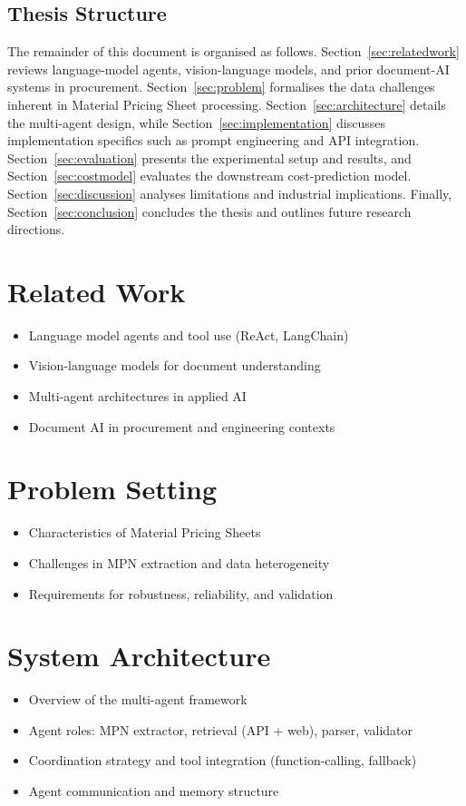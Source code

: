 \documentclass[11pt]{article}
\begin{document}
\subsection{Thesis Structure}
The remainder of this document is organised as follows.  
Section~\ref{sec:relatedwork} reviews language-model agents, vision-language models, and prior document-AI systems in procurement.  
Section~\ref{sec:problem} formalises the data challenges inherent in Material Pricing Sheet processing.  
Section~\ref{sec:architecture} details the multi-agent design, while Section~\ref{sec:implementation} discusses implementation specifics such as prompt engineering and API integration.  
Section~\ref{sec:evaluation} presents the experimental setup and results, and Section~\ref{sec:costmodel} evaluates the downstream cost-prediction model.  
Section~\ref{sec:discussion} analyses limitations and industrial implications.  
Finally, Section~\ref{sec:conclusion} concludes the thesis and outlines future research directions.


\section{Related Work}
\begin{itemize}
  \item Language model agents and tool use (ReAct, LangChain)
  \item Vision-language models for document understanding
  \item Multi-agent architectures in applied AI
  \item Document AI in procurement and engineering contexts
\end{itemize}

\section{Problem Setting}
\begin{itemize}
  \item Characteristics of Material Pricing Sheets
  \item Challenges in MPN extraction and data heterogeneity
  \item Requirements for robustness, reliability, and validation
\end{itemize}

\section{System Architecture}
\begin{itemize}
  \item Overview of the multi-agent framework
  \item Agent roles: MPN extractor, retrieval (API + web), parser, validator
  \item Coordination strategy and tool integration (function-calling, fallback)
  \item Agent communication and memory structure
\end{itemize}
\end{document}
